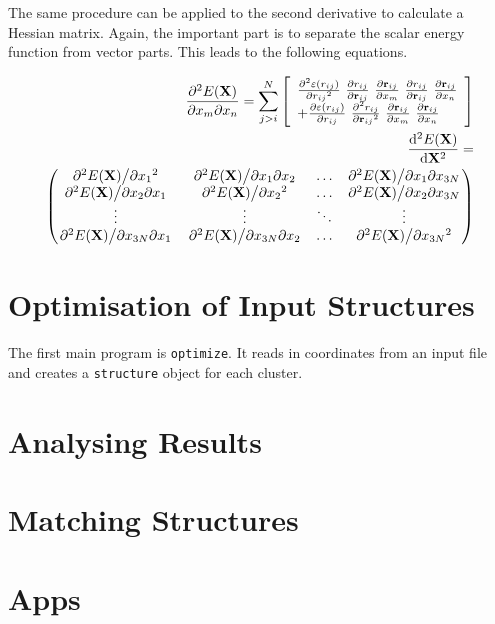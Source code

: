 The same procedure can be applied to the second derivative to calculate a
Hessian matrix. Again, the important part is to separate the scalar energy
function from vector parts. This leads to the following equations.

\begin{align}
    \pdv{E(\mathbf{X})}{x_m}{x_n}=\sum_{j>i}^N\left[  
    \begin{array}{ll}
    \pdv[2]{\varepsilon(r_{ij})}{{r_{ij}}}\  
    \pdv{r_{ij}}{\mathbf{r}_{ij}}\ 
    \pdv{\mathbf{r}_{ij}}{x_m}\ 
    \pdv{r_{ij}}{\mathbf{r}_{ij}}\ 
    \pdv{\mathbf{r}_{ij}}{x_n} \\ 
    +
    \pdv{\varepsilon(r_{ij})}{r_{ij}}\
        \pdv[2]{r_{ij}}{{\mathbf{r}_{ij}}}\ 
    \pdv{\mathbf{r}_{ij}}{x_m}\ 
    \pdv{\mathbf{r}_{ij}}{x_n} 
    \end{array}
    \right]\\
    \begin{aligned}
    \dv[2]{E(\mathbf{X})}{\mathbf{X}}=\\
    \begin{pmatrix}
        \pdv*[2]{E(\mathbf{X})}{{x_1}} & \pdv*{E(\mathbf{X})}{x_1}{x_2} & \ldots & \pdv*{E(\mathbf{X})}{x_1}{x_{3N}}\\
        \pdv*{E(\mathbf{X})}{x_2}{x_1} & \pdv*[2]{E(\mathbf{X})}{{x_2}} & \ldots & \pdv*{E(\mathbf{X})}{x_2}{x_{3N}}\\
        \vdots & \vdots & \ddots & \vdots\\
        \pdv*{E(\mathbf{X})}{x_{3N}}{x_1} & \pdv*{E(\mathbf{X})}{x_{3N}}{x_2} & \ldots & \pdv*[2]{E(\mathbf{X})}{{x_{3N}}}
    \end{pmatrix}
    \end{aligned}
\end{align}

\section{Optimisation of Input Structures}
\label{sec:optimisationofinputstructures}

The first main program is \verb|optimize|. It reads in coordinates from an
input file and creates a \verb|structure| object for each cluster.  

\section{Analysing Results}
\label{sec:analysingresults}

\section{Matching Structures}
\label{sec:matchingstructures}

\section{Apps}
\label{sec:apps}
